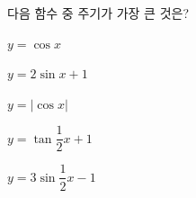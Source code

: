 다음 함수 중 주기가 가장 큰 것은?
\begin{choicesii}{\rule[-3ex]{0pt}{8ex}$y=\cos x$}{\rule[-3ex]{0pt}{8ex}$y=2\sin x+1$}{\rule[-3ex]{0pt}{8ex}$y=|\cos x|$}{\rule[-3ex]{0pt}{8ex}$y=\tan\dfrac{1}{2}x+1$}{\rule[-3ex]{0pt}{8ex}$y=3\sin\dfrac{1}{2}x-1$}\end{choicesii}
